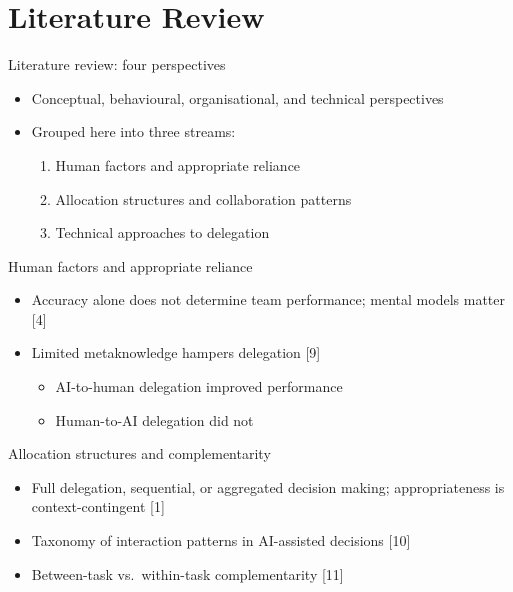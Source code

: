 \documentclass[aspectratio=169,11pt]{beamer}
\begin{document}
\section{Literature Review}

\begin{frame}{Literature review: four perspectives}
  \begin{itemize}
    \item Conceptual, behavioural, organisational, and technical perspectives
    \item Grouped here into three streams:
    \begin{enumerate}
      \item Human factors and appropriate reliance
      \item Allocation structures and collaboration patterns
      \item Technical approaches to delegation
    \end{enumerate}
  \end{itemize}
\end{frame}

\begin{frame}{Human factors and appropriate reliance}
  \begin{itemize}
    \item Accuracy alone does not determine team performance; mental models matter [4]
    \item Limited metaknowledge hampers delegation [9]
    \begin{itemize}
      \item AI-to-human delegation improved performance
      \item Human-to-AI delegation did not
    \end{itemize}
  \end{itemize}
\end{frame}

\begin{frame}{Allocation structures and complementarity}
  \begin{itemize}
    \item Full delegation, sequential, or aggregated decision making; appropriateness is
      context-contingent [1]
    \item Taxonomy of interaction patterns in AI-assisted decisions [10]
    \item Between-task vs.\ within-task complementarity [11]
  \end{itemize}
\end{frame}
\end{document}

